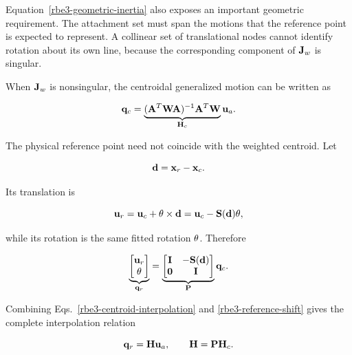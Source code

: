 Equation~\eqref{rbe3-geometric-inertia} also exposes an important geometric
requirement. The attachment set must span the motions that the reference point
is expected to represent. A collinear set of translational nodes cannot identify
rotation about its own line, because the corresponding component of $\mathbf{J}_w$
is singular.

When $\mathbf{J}_w$ is nonsingular, the centroidal generalized motion can be written
as

\begin{equation}\label{rbe3-centroid-interpolation}
    \mathbf{q}_c
    =\underbrace{
      (\mathbf{A}^T\mathbf{W}\mathbf{A})^{-1}\mathbf{A}^T\mathbf{W}
      }_{\mathbf{H}_c}
      \mathbf{u}_a.
\end{equation}

The physical reference point need not coincide with the weighted centroid. Let

\begin{equation}
    \mathbf{d}=\mathbf{x}_r-\mathbf{x}_c.
\end{equation}

Its translation is

\begin{equation}
    \mathbf{u}_r=\mathbf{u}_c+\mathbf{\theta}\times\mathbf{d}
           =\mathbf{u}_c-\mathbf{S}(\mathbf{d})\mathbf{\theta},
\end{equation}

while its rotation is the same fitted rotation $\mathbf{\theta}$. Therefore

\begin{equation}\label{rbe3-reference-shift}
    \underbrace{\begin{bmatrix}
        \mathbf{u}_r\\\mathbf{\theta}
    \end{bmatrix}}_{\mathbf{q}_r}
    =
    \underbrace{\begin{bmatrix}
        \mathbf{I}&-\mathbf{S}(\mathbf{d})\\
        \mathbf{0}&\mathbf{I}
    \end{bmatrix}}_{\mathbf{P}}
    \mathbf{q}_c.
\end{equation}

Combining Eqs.~\eqref{rbe3-centroid-interpolation} and
\eqref{rbe3-reference-shift} gives the complete interpolation relation

\begin{bbox}[0.88]
\begin{equation}\label{rbe3-interpolation-operator}
    \mathbf{q}_r=\mathbf{H}\mathbf{u}_a,
    \qquad
    \mathbf{H}=\mathbf{P}\mathbf{H}_c.
\end{equation}
\end{bbox}

